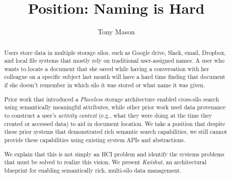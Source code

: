 \documentclass[sigconf,anonymous,10pt,authorversion]{acmart}
\newcommand{\system}[0]{\emph{Kwishut}\xspace}
\begin{document}
\title{Position: Naming is Hard}

\author{Tony Mason}

\renewcommand{\shortauthors}{Mason, et al.}

\begin{abstract}
    Users store data in multiple storage silos, such as Google drive, Slack, email, Dropbox, and local file systems that mostly rely on traditional user-assigned names. A user who wants to locate a document that she saved while having a conversation with her colleague on a specific subject last month will have a hard time finding that document if she doesn’t remember in which silo it was stored or what name it was given.
    
    Prior work that introduced a \emph{Placeless} storage architecture enabled cross-silo search using semantically meaningful attributes, while other prior work used data provenance to construct a user's \emph{activity context} (e.g., what they were doing at the time they created or accessed data) to aid in document location. We take a position that despite these prior systems that demonstrated rich semantic search capabilities, we still cannot provide these capabilities using existing system APIs and abstractions. 
    
    We explain that this is not simply an HCI problem and identify the systems problems that must be solved to realize this vision. We present \system, an architectural blueprint for enabling semantically rich, multi-silo data management.
    
\end{abstract}

\maketitle

\thispagestyle{empty}


\balance

\end{document}
